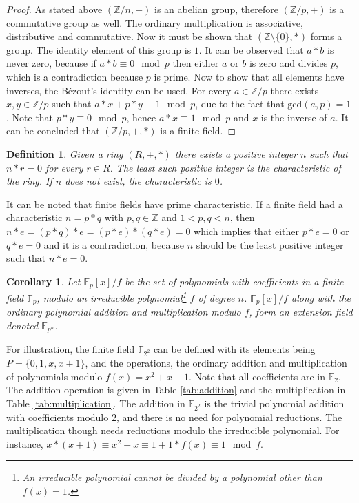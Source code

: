 \documentclass{ufsctex/ufsctex}
\newtheorem{definition}{Definition}
\newtheorem{corollary}{Corollary}
\begin{document}
\begin{proof}
As stated above $(\mathbb{Z}/n, +)$ is an abelian group, therefore
$(\mathbb{Z}/p, +)$ is a commutative group as well. The ordinary multiplication
is associative, distributive and commutative. Now it must be shown that
$(\mathbb{Z} \setminus \{0\}, *)$ forms a group. The identity element of this
group is $1$. It can be observed that $a*b$ is never zero, because if $a*b
\equiv 0 \mod p$ then either $a$ or $b$ is zero and divides $p$, which is a
contradiction because $p$ is prime. Now to show that all elements have
inverses, the Bézout's identity can be used. For every $a \in \mathbb{Z}/p$
there exists $x, y \in \mathbb{Z}/p$ such that $a*x + p*y \equiv 1 \mod p$, due
to the fact that $\text{gcd}(a, p) = 1$. Note that $p*y \equiv 0 \mod p$, hence
$a*x \equiv 1 \mod p$ and $x$ is the inverse of $a$. It can be concluded that
$(\mathbb{Z}/p, +, *)$ is a finite field.
\end{proof}

\begin{definition}
Given a ring $(R, +, *)$ there exists a positive integer $n$ such that $n*r =
0$ for every $r \in R$. The least such positive integer is the characteristic
of the ring. If $n$ does not exist, the characteristic is $0$.
\end{definition}

It can be noted that finite fields have prime characteristic. If a finite field
had a characteristic $n = p*q$ with $p, q \in \mathbb{Z}$ and $1 < p,q < n$,
then $n*e = (p*q)*e = (p*e)*(q*e) = 0$ which implies that either $p*e = 0$ or
$q*e = 0$ and it is a contradiction, because $n$ should be the least positive
integer such that $n*e = 0$.

\begin{corollary}\label{cor:extension}
Let $\mathbb{F}_p[x]/f$ be the set of polynomials with coefficients in a finite
field $\mathbb{F}_p$, modulo an irreducible polynomial\footnote{An irreducible
polynomial cannot be divided by a polynomial other than $f(x) = 1$.} $f$ of
degree $n$. $\mathbb{F}_p[x]/f$ along with the ordinary polynomial addition and
multiplication modulo $f$, form an extension field denoted $\mathbb{F}_{p^n}$.
\end{corollary}

For illustration, the finite field $\mathbb{F}_{2^2}$ can be defined with its
elements being $P = \{0, 1, x, x+1\}$, and the operations, the ordinary
addition and multiplication of polynomials modulo $f(x) = x^2 + x + 1$. Note
that all coefficients are in $\mathbb{F}_2$. The addition operation is given in
Table \ref{tab:addition} and the multiplication in Table
\ref{tab:multiplication}. The addition in $\mathbb{F}_{2^2}$ is the trivial
polynomial addition with coefficients modulo $2$, and there is no need for
polynomial reductions. The multiplication though needs reductions modulo the
irreducible polynomial. For instance, $x*(x+1) \equiv x^2+x \equiv 1 + 1*f(x)
\equiv 1 \mod f$.
\end{document}
